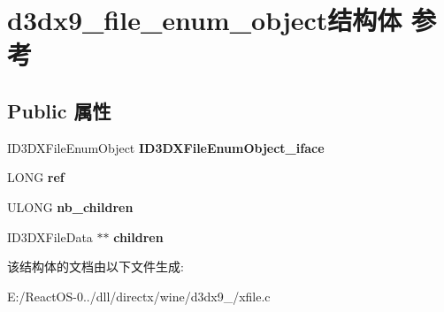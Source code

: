\hypertarget{structd3dx9__file__enum__object}{}\section{d3dx9\+\_\+file\+\_\+enum\+\_\+object结构体 参考}
\label{structd3dx9__file__enum__object}
\subsection*{Public 属性}
\begin{DoxyCompactItemize}
\item 
\mbox{\label{structd3dx9__file__enum__object_a6ca47351ad13cd85f4abd2a5736dc15d}} 
I\+D3\+D\+X\+File\+Enum\+Object {\bfseries I\+D3\+D\+X\+File\+Enum\+Object\+\_\+iface}
\item 
\mbox{\label{structd3dx9__file__enum__object_a440316a63f1b2c2d39aab27f7e635384}} 
L\+O\+NG {\bfseries ref}
\item 
\mbox{\label{structd3dx9__file__enum__object_a0698af760b187aac901dad1b80a1bf86}} 
U\+L\+O\+NG {\bfseries nb\+\_\+children}
\item 
\mbox{\label{structd3dx9__file__enum__object_a936cc6ba31d9b7d8d6ba66ed1f2de250}} 
I\+D3\+D\+X\+File\+Data $\ast$$\ast$ {\bfseries children}
\end{DoxyCompactItemize}


该结构体的文档由以下文件生成\+:\begin{DoxyCompactItemize}
\item 
E\+:/\+React\+O\+S-\/0../dll/directx/wine/d3dx9\+\_/xfile.\+c\end{DoxyCompactItemize}

